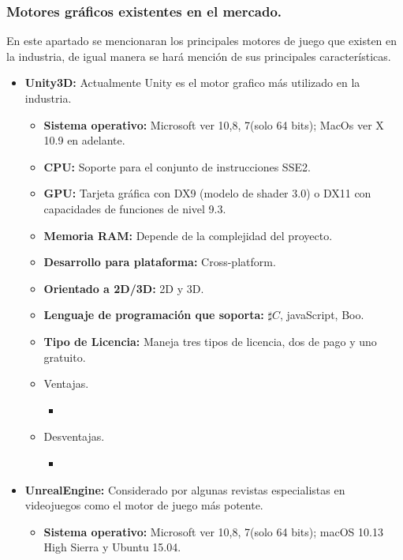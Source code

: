 \subsubsection{Motores gráficos existentes en el mercado.}
En este apartado se mencionaran los principales motores de juego que existen en la industria, de igual manera se hará mención de sus principales características.

	\begin{itemize}
		\item \textbf{Unity3D:} Actualmente Unity es el motor grafico más utilizado en la industria. 
			\begin{itemize}
				\item \textbf{Sistema operativo:} Microsoft ver 10,8, 7(solo 64 bits); MacOs ver X 10.9 en adelante.
				\item \textbf{CPU:} Soporte para el conjunto de instrucciones SSE2.
				\item \textbf{GPU:} Tarjeta gráfica con DX9 (modelo de shader 3.0) o DX11 con capacidades de funciones de nivel 9.3.
				\item \textbf{Memoria RAM:} Depende de la complejidad del proyecto.
				\item \textbf{Desarrollo para plataforma:} Cross-platform.
				\item \textbf{Orientado a 2D/3D:} 2D y 3D.
				\item \textbf{Lenguaje de programación que soporta:} $\sharp C$, javaScript, Boo.
				\item \textbf{Tipo de Licencia:} Maneja tres tipos de licencia, dos de pago y uno gratuito. \cite{Ref:Unity} 
				\item Ventajas.
					\begin{itemize}
						\item						
					\end{itemize}
				\item Desventajas.
					\begin{itemize}
						\item
					\end{itemize}
			\end{itemize}		
		\item \textbf{UnrealEngine:} Considerado por algunas revistas especialistas en videojuegos como el motor de juego más potente. 
			\begin{itemize}
				\item \textbf{Sistema operativo:} Microsoft ver 10,8, 7(solo 64 bits); macOS 10.13 High Sierra y Ubuntu 15.04.

\end{itemize}
\end{itemize}
